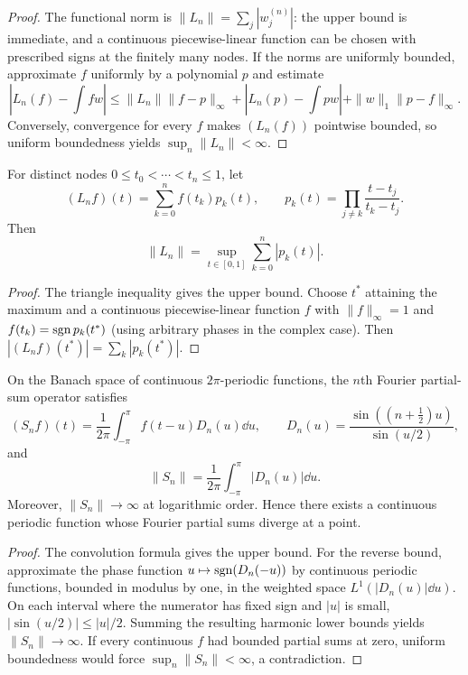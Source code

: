 \begin{proof}
The functional norm is
$\|L_n\|=\sum_j|w_j^{(n)}|$: the upper bound is immediate, and a continuous
piecewise-linear function can be chosen with prescribed signs at the finitely
many nodes.  If the norms are uniformly bounded, approximate $f$ uniformly by
a polynomial $p$ and estimate
\[
 |L_n(f)-\textstyle\int fw|
 \le\|L_n\|\|f-p\|_\infty
     +|L_n(p)-\textstyle\int pw|
     +\|w\|_1\|p-f\|_\infty.
\]
Conversely, convergence for every $f$ makes $(L_n(f))$ pointwise bounded, so
uniform boundedness yields $\sup_n\|L_n\|<\infty$.
\end{proof}

\begin{notetheorem}
For distinct nodes $0\le t_0<\cdots<t_n\le1$, let
\[
  (L_nf)(t)=\sum_{k=0}^nf(t_k)p_k(t),
  \qquad
  p_k(t)=\prod_{j\ne k}\frac{t-t_j}{t_k-t_j}.
\]
Then
\[
  \|L_n\|
  =\sup_{t\in[0,1]}\sum_{k=0}^n|p_k(t)|.
\]
\end{notetheorem}

\begin{proof}
The triangle inequality gives the upper bound.  Choose $t^*$ attaining the
maximum and a continuous piecewise-linear function $f$ with
$\|f\|_\infty=1$ and
$f(t_k)=\operatorname{sgn} p_k(t^*)$ (using arbitrary phases in the complex case).  Then
$|(L_nf)(t^*)|=\sum_k|p_k(t^*)|$.
\end{proof}

\begin{notetheorem}
On the Banach space of continuous $2\pi$-periodic functions, the $n$th Fourier
partial-sum operator satisfies
\[
  (S_nf)(t)=\frac1{2\pi}\int_{-\pi}^{\pi}f(t-u)D_n(u)\dd u,
  \qquad
  D_n(u)=\frac{\sin((n+\tfrac12)u)}{\sin(u/2)},
\]
and
\[
  \|S_n\|=\frac1{2\pi}\int_{-\pi}^{\pi}|D_n(u)|\dd u.
\]
Moreover, $\|S_n\|\to\infty$ at logarithmic order.  Hence there exists a
continuous periodic function whose Fourier partial sums diverge at a point.
\end{notetheorem}

\begin{proof}
The convolution formula gives the upper bound.  For the reverse bound,
approximate the phase function $u\mapsto\operatorname{sgn}(D_n(-u))$ by continuous
periodic functions, bounded in modulus by one, in the weighted space
$L^1(|D_n(u)|\dd u)$.  On each interval where the numerator has fixed sign
and $|u|$ is small, $|\sin(u/2)|\le |u|/2$.  Summing the resulting harmonic
lower bounds yields $\|S_n\|\to\infty$.  If every continuous $f$ had
bounded partial sums at zero, uniform boundedness would force
$\sup_n\|S_n\|<\infty$, a contradiction.
\end{proof}

